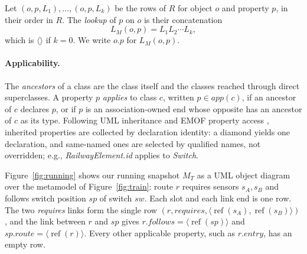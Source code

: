 \begin{definition}[Lookup]\label{def:lookup}
Let $(o,p,L_1),\ldots,(o,p,L_k)$ be the rows of $R$ for object $o$ and
property $p$, in their order in $R$. The \emph{lookup} of $p$ on $o$ is their
concatenation
\[
 L_M(o,p)=L_1L_2\cdots L_k,
\]
which is $\langle\rangle$ if $k=0$. We write $o.p$ for $L_M(o,p)$.
\end{definition}

\paragraph{Applicability.}
The \emph{ancestors} of a class are the class itself and the classes reached
through direct superclasses. A property $p$ \emph{applies} to class $c$, written
$p\in\mathit{app}(c)$, if an ancestor of $c$ declares $p$, or if $p$ is an
association-owned end whose opposite has an ancestor of $c$ as its type.
Following UML inheritance and EMOF property access
\cite{omg_uml_25,omg_mof_251}, inherited properties are collected by
declaration identity: a diamond yields one declaration, and same-named ones are
selected by qualified names, not overridden; e.g., \emph{RailwayElement.id}
applies to \emph{Switch}.

Figure~\ref{fig:running} shows our running snapshot $M_T$ as a UML object
diagram over the metamodel of Figure~\ref{fig:train}: route $r$ requires sensors
$s_A,s_B$ and follows switch position $\mathit{sp}$ of switch $\mathit{sw}$.
Each slot and each link end is one row. The two \emph{requires} links form the
single row $(r,\mathit{requires},\langle\operatorname{ref}(s_A),\operatorname{ref}(s_B)\rangle)$,
and the link between $r$ and $\mathit{sp}$ gives
$r.\mathit{follows}=\langle\operatorname{ref}(\mathit{sp})\rangle$ and
$\mathit{sp}.\mathit{route}=\langle\operatorname{ref}(r)\rangle$. Every other
applicable property, such as $r.\mathit{entry}$, has an empty row.

